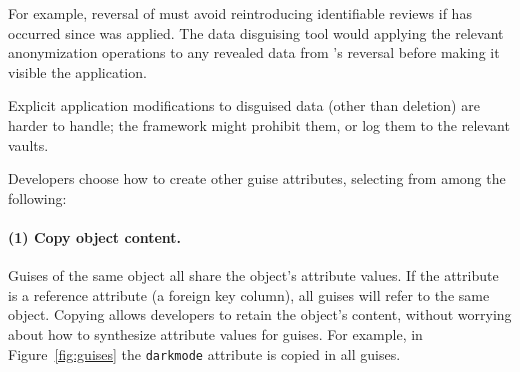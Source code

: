 %
For example, reversal of \gdpr must avoid reintroducing identifiable reviews if \ca has
occurred since \gdpr was applied.
%
The data disguising tool would applying the relevant \ca anonymization operations to any
revealed data from \gdpr's reversal before making it visible the application.
%

%
Explicit application modifications to disguised data (other than deletion) are harder to
handle; the framework might prohibit them, or log them to the relevant vaults.
%


\iffalse
%

%
%
%
Developers choose how to create other guise attributes, selecting from among the following:
%
\paragraph{(1) Copy object content.}
%
Guises of the same object all share the object's attribute values.
%
If the attribute is a reference attribute (\eg a foreign key column), all guises will refer to the same object.
%
%
Copying allows developers to retain the object's content, without worrying about how to
synthesize attribute values for guises.
%
For example, in Figure~\ref{fig:guises} the \texttt{darkmode} attribute is copied in
all guises.

